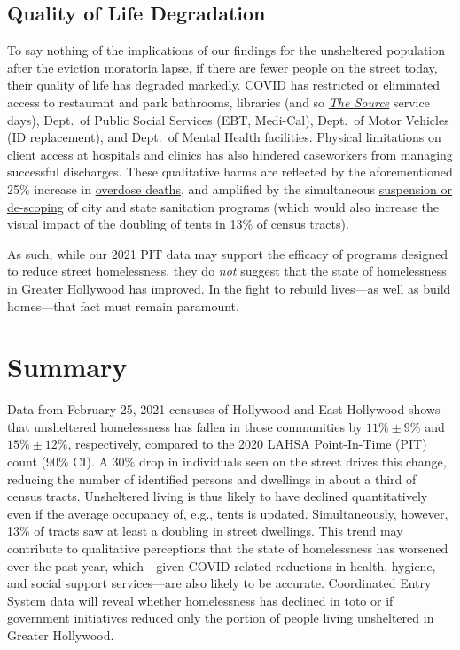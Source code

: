 \documentclass[11pt,twocolumn]{article}
\def\resp{respectively}
\begin{document}
\subsection{Quality of Life Degradation}

To say nothing of the implications of our findings for the unsheltered population 
\href{https://www.latimes.com/california/story/2021-01-12/new-report-foresees-tens-of-thousands-losing-homes-by-2023}
{after the eviction moratoria lapse}, if there are fewer people on the street today, their quality of life has degraded markedly. 
COVID has restricted or eliminated access to restaurant and park bathrooms, libraries (and so 
\href{https://www.lapl.org/homeless-resources/the-source}{\it The Source} service days), Dept.~of Public Social Services 
(EBT, Medi-Cal), Dept.~of Motor Vehicles (ID replacement), and Dept.~of Mental Health facilities. Physical limitations 
on client access at hospitals and clinics has also hindered caseworkers from managing successful discharges. These 
qualitative harms are reflected by the aforementioned 25\% increase in \href{https://www.latimes.com/california/story/2021-01-07/the-powerful-synthetic-opioid-fentanyl-is-behind-rising-deaths-in-the-homeless-population}{overdose deaths}, and
amplified by the simultaneous \href{https://clkrep.lacity.org/onlinedocs/2020/20-0147_misc_3-17-20_p.pdf}
{suspension or de-scoping} of city and state sanitation programs (which would also increase the visual impact of
the doubling of tents in 13\% of census tracts). 

As such, while our 2021 PIT data may support the efficacy of programs designed to reduce street 
homelessness, they do {\it not} suggest that the state of homelessness in Greater Hollywood has improved. 
In the fight to rebuild lives---as well as build homes---that fact must remain paramount.

\section{Summary}
\label{sec:summary}

Data from February 25, 2021 censuses of Hollywood and East Hollywood shows that 
unsheltered homelessness has fallen in those communities by $11\%\pm9\%$ and 
$15\%\pm12\%$, \resp, compared to the 2020 LAHSA Point-In-Time (PIT) count (90\% CI). 
A 30\% drop in individuals seen on the street drives this change, reducing the number of identified 
persons and dwellings in about a third of census tracts. Unsheltered living is thus likely to have 
declined quantitatively even if the average occupancy of, e.g., tents is updated. Simultaneously, 
however, 13\% of tracts saw at least a doubling in street dwellings. This trend may contribute to 
qualitative perceptions that the state of homelessness has worsened over the past year, which---given 
COVID-related reductions in health, hygiene, and social support services---are also likely to be accurate.
Coordinated Entry System data will reveal whether homelessness has declined in toto or if 
government initiatives reduced only the portion of people living unsheltered in Greater Hollywood.
\end{document}

